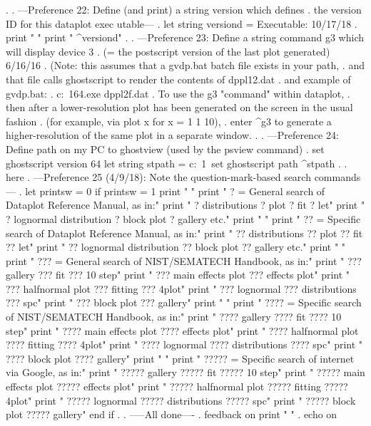 .
. ---Preference 22: Define (and print) a string    version   which defines
.                   the version ID for this dataplot exec utable---
.
let string versiond = Executable: 10/17/18
. print " "
print "      ^versiond"
.
. ---Preference 23: Define a string command    g3    which will display device 3
.                   (= the postscript version of the last plot generated)          6/16/16
.    (Note: this assumes that a gvdp.bat batch file exists in your path,
.    and that file calls ghostscript to render the contents of    dppl12.dat
.    and example of gvdp.bat:
.       c:\progra~1\ghostgum\gsview\gsview64.exe dppl2f.dat
.    To use the    g3   "command" within dataplot,
.    then after a lower-resolution plot has been generated on the screen in the usual fashion
.    (for example, via    plot x for x = 1 1 10),
.    enter   ^g3   to generate a higher-resolution of the same plot in a separate window.
.
. ---Preference 24: Define path on my PC to ghostview (used by the    psview    command)
.
set ghostscript version 64
let string stpath = c:\progra~1\gs{}\bin\
set ghostscript path ^stpath
.
. here
. ---Preference 25 (4/9/18): Note the question-mark-based search commands---
.
let printsw = 0
if printsw = 1
   print " "
   print "      ? = General  search of Dataplot Reference Manual, as in:"
   print "          ? distributions   ? plot   ? fit   ? let"
   print "          ? lognormal distribution   ? block plot   ? gallery   etc."
   print " "
   print "     ?? = Specific search of Dataplot Reference Manual, as in:"
   print "          ?? distributions   ?? plot   ?? fit   ?? let"
   print "          ?? lognormal distribution    ?? block plot   ?? gallery   etc."
   print " "
   print "    ??? = General  search of NIST/SEMATECH Handbook, as in:"
   print "          ??? gallery   ??? fit   ??? 10 step"
   print "          ??? main effects plot   ??? effects plot"
   print "          ??? halfnormal plot     ??? fitting   ??? 4plot"
   print "          ??? lognormal   ??? distributions   ??? spc"
   print "          ??? block plot  ??? gallery"
   print " "
   print "   ???? = Specific search of NIST/SEMATECH Handbook, as in:"
   print "          ???? gallery   ???? fit   ???? 10 step"
   print "          ???? main effects plot   ???? effects plot"
   print "          ???? halfnormal plot     ???? fitting   ???? 4plot"
   print "          ???? lognormal   ???? distributions   ???? spc"
   print "          ???? block plot   ???? gallery"
   print " "
   print "  ????? = Specific search of internet via Google, as in:"
   print "          ????? gallery   ????? fit   ????? 10 step"
   print "          ????? main effects plot   ????? effects plot"
   print "          ????? halfnormal plot     ????? fitting   ????? 4plot"
   print "          ????? lognormal   ????? distributions   ????? spc"
   print "          ????? block plot   ????? gallery"
end if
.
. -----All done----
.
feedback on
print " "
. echo on
